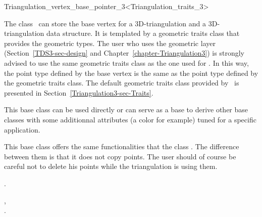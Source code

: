 

\begin{ccRefClass}{Triangulation_vertex_base_pointer_3<Triangulation_traits_3>}  %


\ccDefinition
  
The class \ccRefName\ can store the base vertex for a 3D-triangulation 
and a 3D-triangulation data structure. It is templated by a
geometric traits class  that provides the geometric
types. The user who uses the geometric layer
(Section~\ref{TDS3-sec-design} and
Chapter~\ref{chapter-Triangulation3}) is strongly advised to use the
same geometric traits class  as the one used for
. 
In this way, the point type
defined by the base vertex is the same as the point type defined by
the geometric traits class. The default geometric traits class
provided by \cgal\ is presented in
Section~\ref{Triangulation3-sec-Traits}. 

This base class can be used directly or can serve as a base to derive
other base classes with some additionnal attributes (a color for
example) tuned for a specific application.

This base class offers the same functionalities that the class
. The difference between them is that 
it does not copy points. The user should of course be careful not to
delete his points while the triangulation is using them. 


\ccIsModel

.

\ccSeeAlso

,\\
.



\end{ccRefClass}


